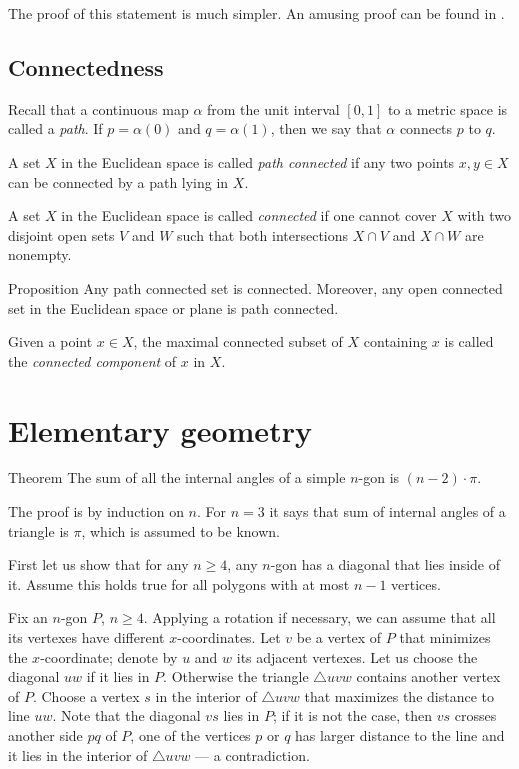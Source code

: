 The proof of this statement is much simpler.
An amusing proof can be found in \cite{chambers-liokumovich}.

\section*{Connectedness}

Recall that a continuous map $\alpha$ from the unit interval $[0,1]$ to a metric space is called a \emph{path}. If $p=\alpha (0)$ and $q = \alpha (1)$, then we say that $\alpha$ connects $p$ to $q$.


A set $X$ in the Euclidean space is called \emph{path connected} if any two points $x,y\in X$ can be connected by a path lying in $X$.

A set $X$ in the Euclidean space is called \emph{connected} if one cannot cover $X$ with two disjoint open sets $V$ and $W$ such that both intersections $X\cap V$ and $X\cap W$ are nonempty.

\begin{thm}{Proposition}
Any path connected set is connected.
Moreover, any open connected set in the Euclidean space or  plane is path connected.
\end{thm}

Given a point $x\in X$, the maximal connected subset of $X$ containing $x$ is called the \emph{connected component} of $x$ in $X$.



\chapter{Elementary geometry}

\begin{thm}{Theorem}\label{thm:sum=(n-2)pi}
The sum of all the internal angles of a simple $n$-gon is $(n-2)\cdot\pi$. 
\end{thm}


The proof is by induction on $n$.
For $n=3$ it says that sum of internal angles of a triangle is $\pi$, which is assumed to be known.

First let us show that for any $n\ge4$, any $n$-gon has a diagonal that lies inside of it.
Assume this holds true for all polygons with at most $n-1$ vertices.

Fix an $n$-gon $P$, $n\ge4$.
Applying a rotation if necessary, we can assume that all its vertexes have different $x$-coordinates.
Let $v$ be a vertex of $P$ that minimizes the $x$-coordinate;
denote by $u$ and $w$ its adjacent vertexes.
Let us choose the diagonal $uw$ if it lies in $P$.
Otherwise the triangle $\triangle uvw$ contains another vertex of $P$.
Choose a vertex $s$ in the interior of $\triangle uvw$ that maximizes the distance to line $uw$.
Note that the diagonal $vs$ lies in $P$;
if it is not the case, then $vs$ crosses another side $pq$ of $P$, one of the vertices $p$ or $q$ has larger distance to the line and it lies in the interior of $\triangle uvw$ --- a contradiction.

